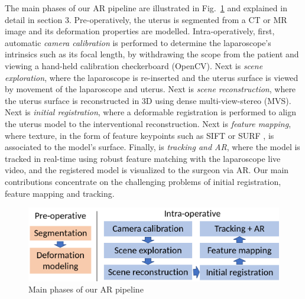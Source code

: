The main phases of our AR pipeline are illustrated in Fig.~\ref{fig:processOverview} and explained in detail in section 3. Pre-operatively, the uterus is segmented from a CT or MR image and its deformation properties are modelled. Intra-operatively, first, automatic \emph{camera calibration} is performed to determine the laparoscope's intrinsics such as its focal length, by withdrawing the scope from the patient and viewing a hand-held calibration checkerboard (OpenCV). Next is \emph{scene exploration}, where the laparoscope is re-inserted and the uterus surface is viewed by movement of the laparoscope and uterus. Next is \emph{scene reconstruction}, where the uterus surface is reconstructed in 3D using dense multi-view-stereo (MVS). Next is \emph{initial registration}, where a deformable registration is performed to align the uterus model to the interventional reconstruction. Next is \emph{feature mapping}, where texture, in the form of feature keypoints such as SIFT \cite{Lowe:2004:DIF:993451.996342} or SURF \cite{SURF}, is associated to the model's surface. Finally, is \emph{tracking and AR}, where the model is tracked in real-time using robust feature matching with the laparoscope live video, and the registered model is visualized to the surgeon via AR. Our main contributions concentrate on the challenging problems of initial registration, feature mapping and tracking. 

\begin{figure}[t]
	\centering
	\includegraphics[width=0.8\columnwidth]{./figs/overview.png}
	\caption{Main phases of our AR pipeline}
	\label{fig:processOverview}
\end{figure}




